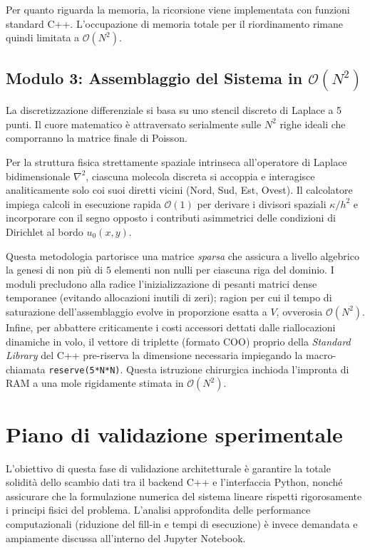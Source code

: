 \documentclass[a4paper,12pt]{article}
\begin{document}
Per quanto riguarda la memoria, la ricorsione viene implementata con funzioni standard C++. L'occupazione di memoria totale per il riordinamento rimane quindi limitata a $\mathcal{O}(N^2)$.

\vspace{0.5cm}

\subsection{Modulo 3: Assemblaggio del Sistema in $\mathcal{O}(N^2)$}
La discretizzazione differenziale si basa su uno stencil discreto di Laplace a 5 punti. Il cuore matematico è attraversato serialmente sulle $N^2$ righe ideali che comporranno la matrice finale di Poisson.

Per la struttura fisica strettamente spaziale intrinseca all'operatore di Laplace bidimensionale $\nabla^2$, ciascuna molecola discreta si accoppia e interagisce analiticamente solo coi suoi diretti vicini (Nord, Sud, Est, Ovest). Il calcolatore impiega calcoli in esecuzione rapida $\mathcal{O}(1)$ per derivare i divisori spaziali $\kappa / h^2$ e incorporare con il segno opposto i contributi asimmetrici delle condizioni di Dirichlet al bordo $u_0(x,y)$.

Questa metodologia partorisce una matrice \textit{sparsa} che assicura a livello algebrico la genesi di non più di $5$ elementi non nulli per ciascuna riga del dominio. I moduli precludono alla radice l'inizializzazione di pesanti matrici dense temporanee (evitando allocazioni inutili di zeri); ragion per cui il tempo di saturazione dell'assemblaggio evolve in proporzione esatta a $V$, ovverosia $\mathcal{O}(N^2)$.
Infine, per abbattere criticamente i costi accessori dettati dalle riallocazioni dinamiche in volo, il vettore di triplette (formato COO) proprio della \textit{Standard Library} del C++ pre-riserva la dimensione necessaria impiegando la macro-chiamata \texttt{reserve(5*N*N)}. Questa istruzione chirurgica inchioda l'impronta di RAM a una mole rigidamente stimata in $\mathcal{O}(N^2)$.
\newpage
\section{Piano di validazione sperimentale}

L'obiettivo di questa fase di validazione architetturale è garantire la totale solidità dello scambio dati tra il backend C++ e l'interfaccia Python, nonché assicurare che la formulazione numerica del sistema lineare rispetti rigorosamente i principi fisici del problema. L'analisi approfondita delle performance computazionali (riduzione del fill-in e tempi di esecuzione) è invece demandata e ampiamente discussa all'interno del Jupyter Notebook.
\end{document}
